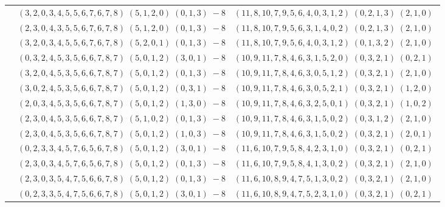 \documentclass[11pt]{article}
\begin{document}
\begin{longtable}[l]{|c|c|c|}
 \cline{2-3} 
 & $(3 ,2 ,0 ,3 ,4 ,5 ,5 ,6 ,7 ,6 ,7 ,8) \;(5 ,1 ,2 ,0) \;(0 ,1 ,3) \;-8$ & $(11 ,8 ,10 ,7 ,9 ,5 ,6 ,4 ,0 ,3 ,1 ,2) \;(0 ,2 ,1 ,3) \;(2 ,1 ,0) \;$\\ 
 \cline{2-3} 
 & $(2 ,3 ,0 ,4 ,3 ,5 ,5 ,6 ,7 ,6 ,7 ,8) \;(5 ,1 ,2 ,0) \;(0 ,1 ,3) \;-8$ & $(11 ,8 ,10 ,7 ,9 ,5 ,6 ,3 ,1 ,4 ,0 ,2) \;(0 ,2 ,1 ,3) \;(2 ,1 ,0) \;$\\ 
 \cline{2-3} 
 & $(3 ,2 ,0 ,3 ,4 ,5 ,5 ,6 ,7 ,6 ,7 ,8) \;(5 ,2 ,0 ,1) \;(0 ,1 ,3) \;-8$ & $(11 ,8 ,10 ,7 ,9 ,5 ,6 ,4 ,0 ,3 ,1 ,2) \;(0 ,1 ,3 ,2) \;(2 ,1 ,0) \;$\\ 
 \cline{2-3} 
 & $(0 ,3 ,2 ,4 ,5 ,3 ,5 ,6 ,6 ,7 ,8 ,7) \;(5 ,0 ,1 ,2) \;(3 ,0 ,1) \;-8$ & $(10 ,9 ,11 ,7 ,8 ,4 ,6 ,3 ,1 ,5 ,2 ,0) \;(0 ,3 ,2 ,1) \;(0 ,2 ,1) \;$\\ 
 \cline{2-3} 
 & $(3 ,2 ,0 ,4 ,5 ,3 ,5 ,6 ,6 ,7 ,8 ,7) \;(5 ,0 ,1 ,2) \;(0 ,1 ,3) \;-8$ & $(10 ,9 ,11 ,7 ,8 ,4 ,6 ,3 ,0 ,5 ,1 ,2) \;(0 ,3 ,2 ,1) \;(2 ,1 ,0) \;$\\ 
 \cline{2-3} 
 & $(3 ,0 ,2 ,4 ,5 ,3 ,5 ,6 ,6 ,7 ,8 ,7) \;(5 ,0 ,1 ,2) \;(0 ,3 ,1) \;-8$ & $(10 ,9 ,11 ,7 ,8 ,4 ,6 ,3 ,0 ,5 ,2 ,1) \;(0 ,3 ,2 ,1) \;(1 ,2 ,0) \;$\\ 
 \cline{2-3} 
 & $(2 ,0 ,3 ,4 ,5 ,3 ,5 ,6 ,6 ,7 ,8 ,7) \;(5 ,0 ,1 ,2) \;(1 ,3 ,0) \;-8$ & $(10 ,9 ,11 ,7 ,8 ,4 ,6 ,3 ,2 ,5 ,0 ,1) \;(0 ,3 ,2 ,1) \;(1 ,0 ,2) \;$\\ 
 \cline{2-3} 
 & $(2 ,3 ,0 ,4 ,5 ,3 ,5 ,6 ,6 ,7 ,8 ,7) \;(5 ,1 ,0 ,2) \;(0 ,1 ,3) \;-8$ & $(10 ,9 ,11 ,7 ,8 ,4 ,6 ,3 ,1 ,5 ,0 ,2) \;(0 ,3 ,1 ,2) \;(2 ,1 ,0) \;$\\ 
 \cline{2-3} 
 & $(2 ,3 ,0 ,4 ,5 ,3 ,5 ,6 ,6 ,7 ,8 ,7) \;(5 ,0 ,1 ,2) \;(1 ,0 ,3) \;-8$ & $(10 ,9 ,11 ,7 ,8 ,4 ,6 ,3 ,1 ,5 ,0 ,2) \;(0 ,3 ,2 ,1) \;(2 ,0 ,1) \;$\\ 
 \cline{2-3} 
 & $(0 ,2 ,3 ,3 ,4 ,5 ,7 ,6 ,5 ,6 ,7 ,8) \;(5 ,0 ,1 ,2) \;(3 ,0 ,1) \;-8$ & $(11 ,6 ,10 ,7 ,9 ,5 ,8 ,4 ,2 ,3 ,1 ,0) \;(0 ,3 ,2 ,1) \;(0 ,2 ,1) \;$\\ 
 \cline{2-3} 
 & $(2 ,3 ,0 ,3 ,4 ,5 ,7 ,6 ,5 ,6 ,7 ,8) \;(5 ,0 ,1 ,2) \;(0 ,1 ,3) \;-8$ & $(11 ,6 ,10 ,7 ,9 ,5 ,8 ,4 ,1 ,3 ,0 ,2) \;(0 ,3 ,2 ,1) \;(2 ,1 ,0) \;$\\ 
 \cline{2-3} 
 & $(2 ,3 ,0 ,3 ,5 ,4 ,7 ,5 ,6 ,6 ,7 ,8) \;(5 ,0 ,1 ,2) \;(0 ,1 ,3) \;-8$ & $(11 ,6 ,10 ,8 ,9 ,4 ,7 ,5 ,1 ,3 ,0 ,2) \;(0 ,3 ,2 ,1) \;(2 ,1 ,0) \;$\\ 
 \cline{2-3} 
 & $(0 ,2 ,3 ,3 ,5 ,4 ,7 ,5 ,6 ,6 ,7 ,8) \;(5 ,0 ,1 ,2) \;(3 ,0 ,1) \;-8$ & $(11 ,6 ,10 ,8 ,9 ,4 ,7 ,5 ,2 ,3 ,1 ,0) \;(0 ,3 ,2 ,1) \;(0 ,2 ,1) \;$\\ 

\end{longtable}
\end{document}
